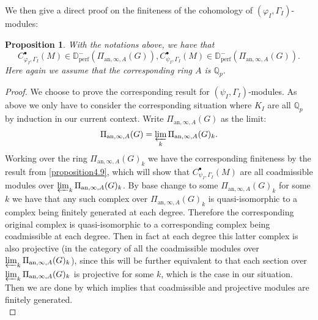 \documentclass[12pt]{amsart}
\newtheorem{proposition}[theorem]{Proposition}
\theoremstyle{definition}
\numberwithin{equation}{section}
\begin{document}
\indent We then give a direct proof on the finiteness of the cohomology of $(\varphi_I,\Gamma_I)$-modules:

\begin{proposition}
With the notations above, we have that 
\begin{displaymath}
C^\bullet_{\varphi_I,\Gamma_{I}}(M)\in \mathbb{D}_\mathrm{perf}^-(\Pi_{\mathrm{an},\infty,A }(G)), C^\bullet_{\psi_I,\Gamma_{I}}(M)\in \mathbb{D}_\mathrm{perf}^-(\Pi_{\mathrm{an},\infty,A }(G)).
\end{displaymath}
Here again we assume that the corresponding ring $A$ is $\mathbb{Q}_p$.
\end{proposition}

\begin{proof}
We choose to prove the corresponding result for $(\psi_I,\Gamma_I)$-modules. As above we only have to consider the corresponding situation where $K_I$ are all $\mathbb{Q}_p$ by induction in our current context. Write $\Pi_{\mathrm{an},\infty,A }(G)$ as the limit:
\begin{displaymath}
\Pi_{\mathrm{an},\infty,A }(G)=\varprojlim_k \Pi_{\mathrm{an},\infty,A }(G)_k.	
\end{displaymath}
Working over the ring $\Pi_{\mathrm{an},\infty,A }(G)_k$ we have the corresponding finiteness by the result from \cref{proposition4.9}, which will show that $C^\bullet_{\psi_I,\Gamma_{I}}(M)$ are all coadmissible modules over $\varprojlim_k \Pi_{\mathrm{an},\infty,A }(G)_k$. By base change to some $\Pi_{\mathrm{an},\infty,A }(G)_k$ for some $k$ we have that any such complex over $ \Pi_{\mathrm{an},\infty,A }(G)_k$ is quasi-isomorphic to a complex being finitely generated at each degree. Therefore the corresponding original complex is quasi-isomorphic to a corresponding complex being coadmissible at each degree. Then in fact at each degree this latter complex is also projective (in the category of all the coadmissible modules over $\varprojlim_k \Pi_{\mathrm{an},\infty,A }(G)_k$), since this will be further equivalent to that each section over $\varprojlim_k \Pi_{\mathrm{an},\infty,A }(G)_k$ is projective for some $k$, which is the case in our situation. Then we are done by \cite[Theorem 3.10]{Zab1} which implies that coadmissible and projective modules are finitely generated.\\ 
\end{proof}
\end{document}

